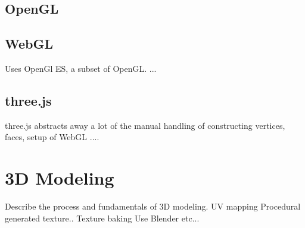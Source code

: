 \subsection{OpenGL}

\subsection{WebGL}
Uses OpenGl ES, a subset of OpenGL. ...

\subsection{three.js}
three.js abstracts away a lot of the manual handling of constructing vertices, faces, setup of WebGL ....

\section{3D Modeling}
Describe the process and fundamentals of 3D modeling.
UV mapping
Procedural generated texture..
Texture baking
Use Blender etc...

